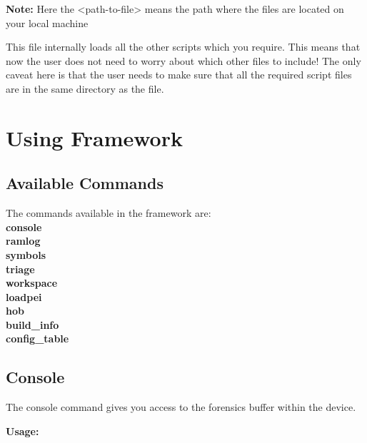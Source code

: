 
\textbf{Note:} Here the <path-to-file> means the path where the files are 
located on your local machine

This file internally loads all the other scripts which you require. This means that 
now the user does not need to worry about which other files to include! The only 
caveat here is that the user needs to make sure that all the required script files
are in the same directory as the  file. 

\section{Using Framework}

\subsection{Available Commands}

The commands available in the framework are: \\

\textcolor{SmokeyDarkBlue}{\bfseries console}\\
\textcolor{SmokeyDarkBlue}{\bfseries ramlog}\\
\textcolor{SmokeyDarkBlue}{\bfseries symbols}\\
\textcolor{SmokeyDarkBlue}{\bfseries triage}\\
\textcolor{SmokeyDarkBlue}{\bfseries workspace}\\
\textcolor{SmokeyDarkBlue}{\bfseries loadpei}\\
\textcolor{SmokeyDarkBlue}{\bfseries hob}\\
\textcolor{SmokeyDarkBlue}{\bfseries build\_info}\\
\textcolor{SmokeyDarkBlue}{\bfseries config\_table} \\

\subsection{Console}

The console command gives you access to the forensics buffer within the device.

\textcolor{SmokeyDarkBlue}{\bfseries Usage:} 


